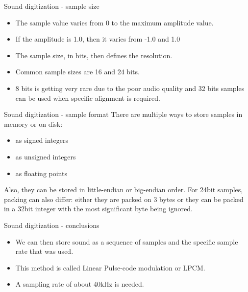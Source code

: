 \begin{frame}{Sound digitization - sample size}
  \begin{itemize}
  \item The sample value varies from 0 to the maximum amplitude value.
  \item If the amplitude is 1.0, then it varies from -1.0 and 1.0
  \item The sample size, in bits, then defines the resolution.
  \item Common sample sizes are 16 and 24 bits.
  \item 8 bits is getting very rare due to the poor audio quality and
    32 bits samples can be used when specific alignment is required.
  \end{itemize}
\end{frame}

\begin{frame}{Sound digitization - sample format}
  There are multiple ways to store samples in memory or on disk:
  \begin{itemize}
  \item as signed integers
  \item as unsigned integers
  \item as floating points
  \end{itemize}
  Also, they can be stored in little-endian or big-endian order.
  For 24bit samples, packing can also differ: either they are packed
  on 3 bytes or they can be packed in a 32bit integer with the most
  significant byte being ignored.
\end{frame}

\begin{frame}{Sound digitization - conclusions}
  \begin{itemize}
  \item We can then store sound as a sequence of samples and the
    specific sample rate that was used.
  \item This method is called Linear Pulse-code modulation or LPCM.
  \item A sampling rate of about 40kHz is needed.
  \end{itemize}
\end{frame}

